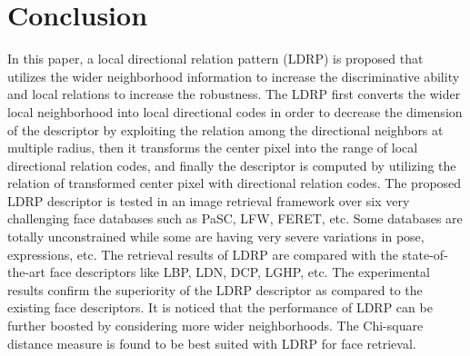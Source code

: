 \documentclass[a4paper]{article}
\begin{document}
\section{Conclusion}
In this paper, a local directional relation pattern (LDRP) is proposed that utilizes the wider neighborhood information to increase the discriminative ability and local relations to increase the robustness. The LDRP first converts the wider local neighborhood into local directional codes in order to decrease the dimension of the descriptor by exploiting the relation among the directional neighbors at multiple radius, then it transforms the center pixel into the range of local directional relation codes, and finally the descriptor is computed by utilizing the relation of transformed center pixel with directional relation codes. The proposed LDRP descriptor is tested in an image retrieval framework over six very challenging face databases such as PaSC, LFW, FERET, etc. Some databases are totally unconstrained while some are having very severe variations in pose, expressions, etc. The retrieval results of LDRP are compared with the state-of-the-art face descriptors like LBP, LDN, DCP, LGHP, etc. The experimental results confirm the superiority of the LDRP descriptor as compared to the existing face descriptors. It is noticed that the performance of LDRP can be further boosted by considering more wider neighborhoods. The Chi-square distance measure is found to be best suited with LDRP for face retrieval. 










\end{document}
